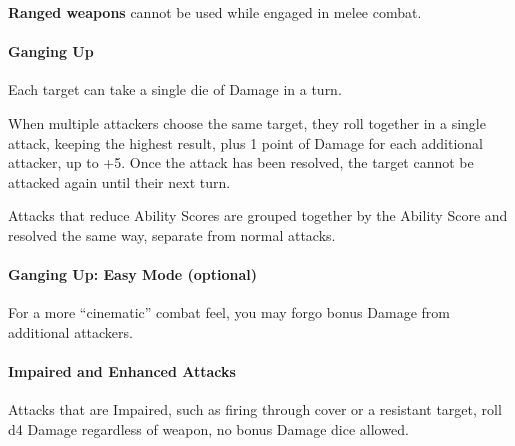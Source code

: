 \documentclass[itdr/core]{subfiles}
\begin{document}
\textbf{Ranged weapons} cannot be used while engaged in melee combat.


\paragraph{Ganging Up}

Each target can take a single die of Damage in a turn.

When multiple attackers choose the same target, they roll together in a single attack, keeping the highest result, plus 1 point of Damage for each additional attacker, up to +5. Once the attack has been resolved, the target cannot be attacked again until their next turn.\tight

Attacks that reduce Ability Scores are grouped together by the Ability Score and resolved the same way, separate from normal attacks.

\begin{comment}
When multiple attackers target an individual, they roll together and keep the highest result, plus 1 point of Damage for each additional attacker, up to +5. Once the attack has been resolved, the target cannot be attacked again until their next turn.

When some of these attacks directly target Ability Scores, they are grouped together by Ability Score targeted and resolved by the same Ganging Up rule, separately from normal attacks.
\end{comment}


\begin{dbox}
\paragraph{Ganging Up: Easy Mode (optional)}
For a more ``cinematic'' combat feel, you may forgo bonus Damage from additional attackers.
\end{dbox}

\vfill
\break

\paragraph{Impaired and Enhanced Attacks}
Attacks that are Impaired, such as firing through cover or a resistant target, roll d4 Damage regardless of weapon, no bonus Damage dice allowed.
\end{document}
